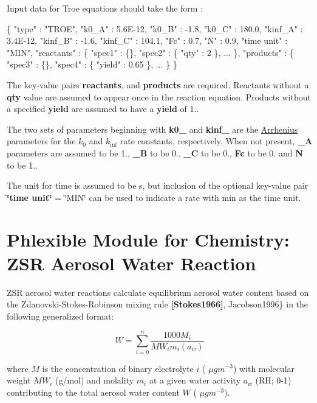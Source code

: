 Input data for Troe equations should take the form \+: 
\begin{DoxyCode}
\{
  "type" : "TROE",
  "k0\_A" : 5.6E-12,
  "k0\_B" : -1.8,
  "k0\_C" : 180.0,
  "kinf\_A" : 3.4E-12,
  "kinf\_B" : -1.6,
  "kinf\_C" : 104.1,
  "Fc"  : 0.7,
  "N"  : 0.9,
  "time unit" : "MIN",
  "reactants" : \{
    "spec1" : \{\},
    "spec2" : \{ "qty" : 2 \},
    ...
  \},
  "products" : \{
    "spec3" : \{\},
    "spec4" : \{ "yield" : 0.65 \},
    ...
  \}
\}
\end{DoxyCode}
 The key-\/value pairs {\bfseries reactants}, and {\bfseries products} are required. Reactants without a {\bfseries qty} value are assumed to appear once in the reaction equation. Products without a specified {\bfseries yield} are assumed to have a {\bfseries yield} of 1..

The two sets of parameters beginning with {\bfseries k0\+\_\+} and {\bfseries kinf\+\_\+} are the \mbox{\hyperlink{phlex_rxn_arrhenius}{Arrhenius}} parameters for the $k_0$ and $k_{\inf}$ rate constants, respectively. When not present, {\bfseries \+\_\+A} parameters are assumed to be 1., {\bfseries \+\_\+B} to be 0., {\bfseries \+\_\+C} to be 0., {\bfseries Fc} to be 0. and {\bfseries N} to be 1..

The unit for time is assumed to be s, but inclusion of the optional key-\/value pair {\bfseries \char`\"{}time unit\char`\"{}} = \char`\"{}\+M\+I\+N\char`\"{} can be used to indicate a rate with min as the time unit. \hypertarget{phlex_rxn_ZSR_aerosol_water}{}\section{Phlexible Module for Chemistry\+: Z\+SR Aerosol Water Reaction}\label{phlex_rxn_ZSR_aerosol_water}
Z\+SR aerosol water reactions calculate equilibrium aerosol water content based on the Zdanovski-\/\+Stokes-\/\+Robinson mixing rule {\bfseries [Stokes1966]}, Jacobson1996\} in the following generalized format\+:

\[ W = \sum\limits_{i=0}^{n}\frac{1000 M_i}{MW_i m_{i}(a_w)} \]

where $M$ is the concentration of binary electrolyte $i$ ( $\mu g m^{-3}$) with molecular weight $MW_i$ (g/mol) and molality $m_{i}$ at a given water activity $a_w$ (RH; 0-\/1) contributing to the total aerosol water content $W$ ( $\mu g m^{-3}$).

